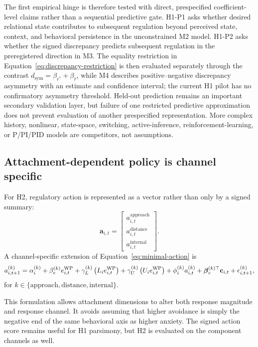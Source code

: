 The first empirical hinge is therefore tested with direct, prespecified coefficient-level claims rather than a sequential predictive gate. H1-P1 asks whether desired relational state contributes to subsequent regulation beyond perceived state, context, and behavioral persistence in the unconstrained M2 model. H1-P2 asks whether the signed discrepancy predicts subsequent regulation in the preregistered direction in M3. The equality restriction in Equation~\ref{eq:discrepancy-restriction} is then evaluated separately through the contrast \(d_{\mathrm{sym}}=\beta_{r^\ast}+\beta_{\hat r}\), while M4 describes positive--negative discrepancy asymmetry with an estimate and confidence interval; the current H1 pilot has no confirmatory asymmetry threshold. Held-out prediction remains an important secondary validation layer, but failure of one restricted predictive approximation does not prevent evaluation of another prespecified representation. More complex history, nonlinear, state-space, switching, active-inference, reinforcement-learning, or P/PI/PID models are competitors, not assumptions.

\subsection{Attachment-dependent policy is channel specific}

For H2, regulatory action is represented as a vector rather than only by a signed summary:
\[
\mathbf a_{i,t}
=
\begin{bmatrix}
a^{\mathrm{approach}}_{i,t} \\
a^{\mathrm{distance}}_{i,t} \\
a^{\mathrm{internal}}_{i,t}
\end{bmatrix}.
\]
A channel-specific extension of Equation~\ref{eq:minimal-action} is
\begin{equation}
a^{(k)}_{i,t+1}
=
\alpha^{(k)}_i
+
\beta^{(k)}_e e^{\mathrm{WP}}_{i,t}
+
\gamma^{(k)}_L \left(L_i e^{\mathrm{WP}}_{i,t}\right)
+
\gamma^{(k)}_U \left(U_i e^{\mathrm{WP}}_{i,t}\right)
+
\phi^{(k)}_i a^{(k)}_{i,t}
+
\boldsymbol{\beta}^{(k)\top}_c\mathbf c_{i,t}
+
\epsilon^{(k)}_{i,t+1},
\label{eq:h2-policy}
\end{equation}
for \(k\in\{\mathrm{approach},\mathrm{distance},\mathrm{internal}\}\).

This formulation allows attachment dimensions to alter both response magnitude and response channel. It avoids assuming that higher avoidance is simply the negative end of the same behavioral axis as higher anxiety. The signed action score remains useful for H1 parsimony, but H2 is evaluated on the component channels as well.

